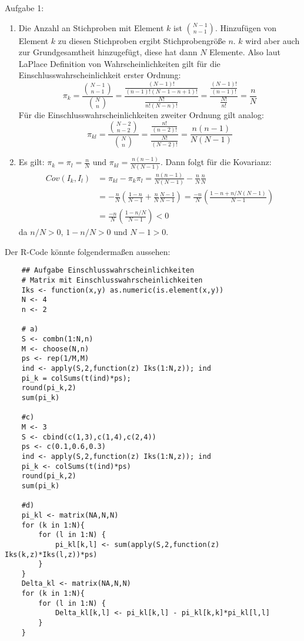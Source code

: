 \begin{Solution}{{Aufgabe 1:}}
		\begin{enumerate}
		\item Die Anzahl an Stichproben mit Element $k$ ist $\binom{N-1}{n-1}$. Hinzufügen von Element $k$ zu diesen Stichproben ergibt Stichprobengröße $n$. $k$ wird aber auch zur Grundgesamtheit hinzugefügt, diese hat dann $N$ Elemente. Also laut LaPlace Definition von Wahrscheinlichkeiten gilt für die Einschlusswahrscheinlichkeit erster Ordnung:
		$$\pi_k = \frac{\binom{N-1}{n-1}}{\binom{N}{n}} = \frac{\frac{(N-1)!}{(n-1)!(N-1-n+1)!}}{\frac{N!}{n!(N-n)!}}=\frac{\frac{(N-1)!}{(n-1)!}}{\frac{N!}{n!}}=\frac{n}{N}$$
		Für die Einschlusswahrscheinlichkeiten zweiter Ordnung gilt analog:
		$$\pi_{kl} = \frac{\binom{N-2}{n-2}}{\binom{N}{n}} = \frac{\frac{n!}{(n-2)!}}{\frac{N!}{(N-2)!}} = \frac{n(n-1)}{N(N-1)}$$
		\item Es gilt: $\pi_k = \pi_l = \frac{n}{N}$ und $\pi_{kl} = \frac{n(n-1)}{N(N-1)}$. Dann folgt für die Kovarianz:
		\begin{align*}
		Cov(I_k,I_l) &= \pi_{kl} - \pi_k \pi_l = \frac{n(n-1)}{N(N-1)} - \frac{n}{N}\frac{n}{N}\\
		&= -\frac{n}{N}\left(\frac{1-n}{N-1}+\frac{n}{N}\frac{N-1}{N-1}\right) = \frac{-n}{N}\left(\frac{1-n+n/N(N-1)}{N-1}\right) \\
		&= \frac{-n}{N}\left(\frac{1-n/N}{N-1}\right) <0
		\end{align*}
		da $n/N>0$, $1-n/N>0$ und $N-1 >0$.
	\end{enumerate}
    Der R-Code könnte folgendermaßen aussehen:
	\begin{lstlisting}
	## Aufgabe Einschlusswahrscheinlichkeiten
	# Matrix mit Einschlusswahrscheinlichkeiten
	Iks <- function(x,y) as.numeric(is.element(x,y))
	N <- 4
	n <- 2

	# a)
	S <- combn(1:N,n)
	M <- choose(N,n)
	ps <- rep(1/M,M)
	ind <- apply(S,2,function(z) Iks(1:N,z)); ind
	pi_k = colSums(t(ind)*ps);
	round(pi_k,2)
	sum(pi_k)

	#c)
	M <- 3
	S <- cbind(c(1,3),c(1,4),c(2,4))
	ps <- c(0.1,0.6,0.3)
	ind <- apply(S,2,function(z) Iks(1:N,z)); ind
	pi_k <- colSums(t(ind)*ps)
	round(pi_k,2)
	sum(pi_k)

	#d)
	pi_kl <- matrix(NA,N,N)
	for (k in 1:N){
		for (l in 1:N) {
			pi_kl[k,l] <- sum(apply(S,2,function(z) Iks(k,z)*Iks(l,z))*ps)
		}
	}
	Delta_kl <- matrix(NA,N,N)
	for (k in 1:N){
		for (l in 1:N) {
			Delta_kl[k,l] <- pi_kl[k,l] - pi_kl[k,k]*pi_kl[l,l]
		}
	}
	\end{lstlisting}

\end{Solution}
